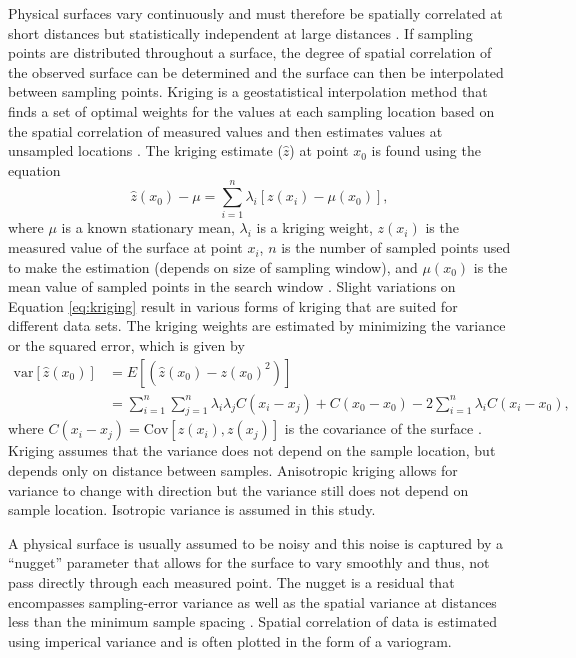 \documentclass{sfuthesis}
\begin{document}
Physical surfaces vary continuously and must therefore be spatially correlated at short distances but statistically independent at large distances \citep{Davis1986}. If sampling points are distributed throughout a surface, the degree of spatial correlation of the observed surface can be determined and the surface can then be interpolated between sampling points. Kriging is a geostatistical interpolation method that finds a set of optimal weights for the values at each sampling location based on the spatial correlation of measured values and then estimates values at unsampled locations \citep{Davis1986, Li2014}. The kriging estimate ($\hat{z}$) at point $x_0$ is found using the equation
\begin{equation}
\label{eq:kriging}
\hat{z}(x_0) - \mu = \sum_{i=1}^{n} \lambda_i [z(x_i)-\mu(x_0)],
\end{equation}
where $\mu$ is a known stationary mean, $\lambda_i$ is a kriging weight, $z(x_i)$ is the measured value of the surface at point $x_i$, $n$ is the number of sampled points used to make the estimation (depends on size of sampling window), and $\mu(x_0)$ is the mean value of sampled points in the search window \citep{Wackernagel2003, Li2008}. Slight variations on Equation \ref{eq:kriging} result in various forms of kriging that are suited for different data sets. The kriging weights are estimated by minimizing the variance or the squared error, which is given by
\begin{align}
\mathrm{var}[\hat{z}(x_0)] &= E[(\hat{z}(x_0)-z(x_0)^2)]\\
&=\sum_{i=1}^{n}\sum_{j=1}^{n}\lambda_i \lambda_j C(x_i-x_j)+C(x_0-x_0)-2 \sum_{i=1}^{n} \lambda_i C(x_i-x_0),
\end{align}
where $C(x_i-x_j) = \mathrm{Cov}[z(x_i),z(x_j)]$ is the covariance of the surface \citep{Li2008}. Kriging assumes that the variance does not depend on the sample location, but depends only on distance between samples.  Anisotropic kriging allows for variance to change with direction but the variance still does not depend on sample location. Isotropic variance is assumed in this study.

A physical surface is usually assumed to be noisy and this noise is captured by a ``nugget'' parameter that allows for the surface to vary smoothly and thus, not pass directly through each measured point. The nugget is a residual that encompasses sampling-error variance as well as the spatial variance at distances less than the minimum sample spacing \citep{Li2008}. Spatial correlation of data is estimated using imperical variance and is often plotted in the form of a variogram.  
\end{document}
